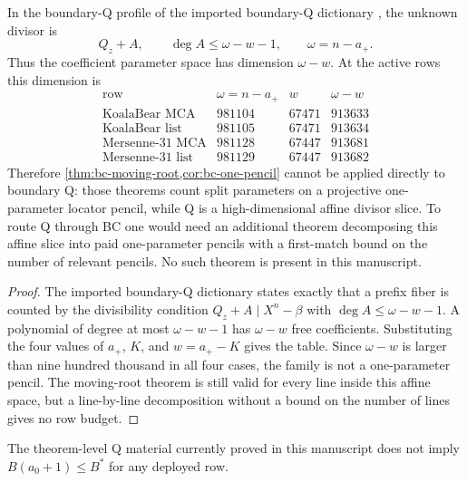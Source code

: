 \documentclass[11pt,a4paper]{amsart}
\numberwithin{equation}{section}
\theoremstyle{remark}
\begin{document}
\begin{proposition}\label{prop:bc-not-q}
In the boundary-Q profile of the imported boundary-Q dictionary \cite[Secs.~18--21]{CAP25v132}, the unknown divisor is
\[
        Q_z+A,
        \qquad
        \deg A\le \omega-w-1,
        \qquad
        \omega=n-a_+ .
\]
Thus the coefficient parameter space has dimension \(\omega-w\).  At the active rows this dimension is
\[
\begin{array}{c|r|r|r}
\text{row} & \omega=n-a_+ & w & \omega-w\\
\hline
\text{KoalaBear MCA} & 981104 & 67471 & 913633\\
\text{KoalaBear list} & 981105 & 67471 & 913634\\
\text{Mersenne-31 MCA} & 981128 & 67447 & 913681\\
\text{Mersenne-31 list} & 981129 & 67447 & 913682
\end{array}
\]
Therefore \cref{thm:bc-moving-root,cor:bc-one-pencil} cannot be applied directly to boundary Q: those theorems count split parameters on a projective one-parameter locator pencil, while Q is a high-dimensional affine divisor slice.  To route Q through BC one would need an additional theorem decomposing this affine slice into paid one-parameter pencils with a first-match bound on the number of relevant pencils.  No such theorem is present in this manuscript.
\end{proposition}

\begin{proof}
The imported boundary-Q dictionary \cite[Secs.~18--21]{CAP25v132} states exactly that a prefix fiber is counted by the divisibility condition \(Q_z+A\mid X^n-\beta\) with \(\deg A\le\omega-w-1\).  A polynomial of degree at most \(\omega-w-1\) has \(\omega-w\) free coefficients.  Substituting the four values of \(a_+\), \(K\), and \(w=a_+-K\) gives the table.  Since \(\omega-w\) is larger than nine hundred thousand in all four cases, the family is not a one-parameter pencil.  The moving-root theorem is still valid for every line inside this affine space, but a line-by-line decomposition without a bound on the number of lines gives no row budget.
\end{proof}

\begin{proposition}\label{prop:q-not-closed}
The theorem-level Q material currently proved in this manuscript does not imply \(B(a_0+1)\le B^*\) for any deployed row.
\end{proposition}
\end{document}
